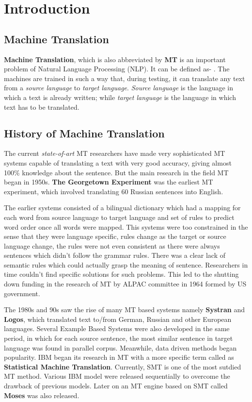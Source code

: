 \chapter{Introduction}
\section{Machine Translation}
    \justify
    \textbf{Machine Translation}, which is also abbreviated by \textbf{MT} is an important problem of Natural Language Processing (NLP). It can be defined as- . The machines are trained in such a way that, during testing, it can translate any text from a \textit{source language} to \textit{target language}. \textit{Source language} is the language in which a text is already written; while \textit{target language} is the language in which text has to be translated. 
    
\section{History of Machine Translation}
    The current \textit{state-of-art} MT researchers have made very sophisticated MT systems capable of translating a text with very good accuracy, giving almost 100\% knowledge about the sentence. But the main research in the field MT began in 1950s. \textbf{The Georgetown Experiment}\cite{MThistory} was the earliest MT experiment, which involved translating 60 Russian sentences into English. 
    
    The earlier systems consisted of a bilingual dictionary which had a mapping for each word from source language to target language and set of rules to predict word order once all words were mapped. This systems were too constrained in the sense that they were language specific, rules change as the target or source language change, the rules were not even consistent as there were always sentences which didn't follow the grammar rules. There was a clear lack of semantic rules which could actually grasp the meaning of sentence. Researchers in time couldn't find specific solutions for such problems. This led to the shutting down funding in the research of MT by ALPAC committee\cite{MThistory} in 1964 formed by US government. 
    
    The 1980s and 90s saw the rise of many MT based systems namely \textbf{Systran} and \textbf{Logos}, which translated text to/from German, Russian and other European languages. Several Example Based Systems were also developed in the same period, in which for each source sentence, the most similar sentence in target language was found in parallel corpus. Meanwhile, data driven methods began popularity. IBM began its research in MT with a more specific term called as \textbf{Statistical Machine Translation}. Currently, SMT is one of the most sutdied MT method. Various IBM model were released sequentially to overcome the drawback of previous models. Later on an MT engine based on SMT called \textbf{Moses} was also released. 
    

